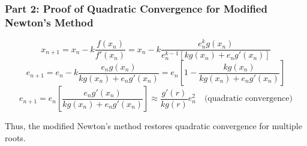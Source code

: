 \documentclass[a4paper]{article}
\begin{document}
\subsubsection*{Part 2: Proof of Quadratic Convergence for Modified Newton's Method}
\[
x_{n+1} = x_n - k \frac{f(x_n)}{f'(x_n)} = x_n - k \frac{e_n^k g(x_n)}{e_n^{k-1} [k g(x_n) + e_n g'(x_n)]}
\]
\[
e_{n+1} = e_n - k \frac{e_n g(x_n)}{k g(x_n) + e_n g'(x_n)} = e_n \left[1 - \frac{k g(x_n)}{k g(x_n) + e_n g'(x_n)}\right]
\]
\[
e_{n+1} = e_n \left[\frac{e_n g'(x_n)}{k g(x_n) + e_n g'(x_n)}\right] \approx \frac{g'(r)}{k g(r)} e_n^2 \quad \text{(quadratic convergence)}
\]

Thus, the modified Newton's method restores quadratic convergence for multiple roots.
\end{document}
